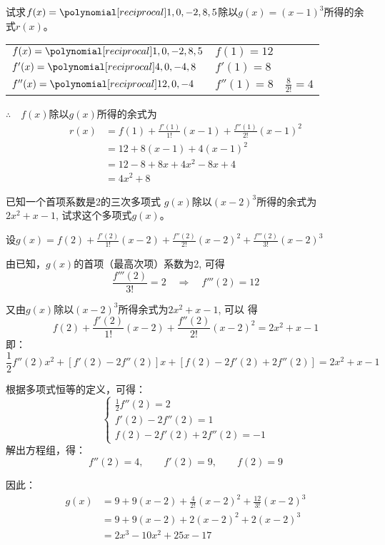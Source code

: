     \begin{example}
试求$f(x)=\poly{1,0,-2,8,5}$除以$g(x)=(x-1)^3$所得的余式$r(x)$。
    \end{example}    
    
    \begin{solution}
\begin{center}
\begin{tabular}{lll}
$f(x)=\poly{1,0,-2,8,5}$  &  $f(1)=12$  \\
$f'(x)=\poly{4,0,-4,8}$  &  $f'(1)=8$  \\
$f''(x)=\poly{12,0,-4}$  &  $f''(1)=8$& $\frac{8}{2!}=4$  \\
\end{tabular}    
\end{center}
          
$\therefore\quad f(x)$除以$g(x)$所得的余式为
\[\begin{split}
    r(x)&=f(1)+\frac{f'(1)}{1!}(x-1)+\frac{f''(1)}{2!}(x-1)^2\\
    &=12+8(x-1)+4(x-1)^2\\
    &=12-8+8x+4x^2-8x+4\\
    &=4x^2+8
\end{split}\]
    \end{solution}

    \begin{example}
已知一个首项系数是2的三次多项式 $g(x)$除以$(x-2)^3$所得的余式为$2x^2+x-1$, 试求这个多项式$g(x)$。
    \end{example}    
    
    \begin{solution}
设$g(x)=f(2)+\frac{f'(2)}{1!}(x-2)+\frac{f''(2)}{2!}(x-2)^2+\frac{f'''(2)}{3!}(x-2)^3$

由已知，$g(x)$的首项（最高次项）系数为2, 可得
\[\frac{f'''(2)}{3!}=2\quad \Rightarrow\quad f'''(2)=12\]

又由$g(x)$除以$(x-2)^3$所得余式为$2x^2+x-1$, 可以
得       
\[f(2)+\frac{f'(2)}{1!}(x-2)+\frac{f''(2)}{2!}(x-2)^2=2x^2+x-1\]
即：
\[\frac{1}{2}f''(2)x^2+[f'(2)-2f''(2)]x+[f(2)-2f'(2)+2f''(2)]=2x^2+x-1\]
 
根据多项式恒等的定义，可得：
\[\begin{cases}
    \frac{1}{2}f''(2)=2\\
    f'(2)-2f''(2)=1\\
    f(2)-2f'(2)+2f''(2)=-1
\end{cases}\]
解出方程组，得：
\[f''(2)=4,\qquad f'(2)=9,\qquad f(2)=9\]

因此：
\[\begin{split}
    g(x)&=9+9(x-2)+\frac{4}{2!}(x-2)^2+\frac{12}{3!}(x-2)^3\\
    &=9+9(x-2)+2(x-2)^2+2(x-2)^3\\
    &=2x^3-10x^2+25x-17
\end{split}\]
   \end{solution}


